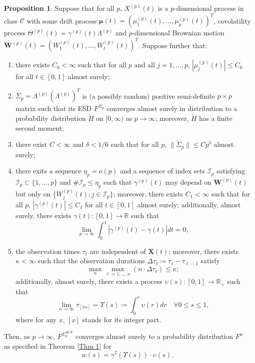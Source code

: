 \documentclass[a4paper,11pt]{book}
\theoremstyle{plain}
\theoremstyle{definition}
\newtheorem{prps}[thm]{Proposition}
\newcommand{\MR}{\mathbb{R}}
\begin{document}
    \begin{prps} \label{prps ups}
    	Suppose that for all $p$, $X^{(p)}(t)$ is a $p$-dimensional process in class $\mathcal{C}$ with some drift process $\boldsymbol{\mu}(t) = (\mu_1^{(p)}(t), \dots, \mu_p^{(p)}(t))^T$, covolatility process $\Theta^{(p)}(t) = \gamma^{(p)}(t) \Lambda^{(p)}$ and $p$-dimensional Brownian motion $\mathbf{W}^{(p)}(t) = (W_1^{(p)}(t), \dots, W_t^{(p)}(t) )^T$. Suppose further that:
    	\begin{enumerate}
    		\item there exists $C_0 < \infty$ such that for all $p$ and all $j = 1, \dots, p$, $|\mu_j^{(p)}(t)| \leq C_0$ for all $t \in [0, 1]$ almost surely;
    		\item $\breve{\Sigma}_p = \Lambda^{(p)} ( \Lambda^{(p)})^T $ is (a possibly random) positive semi-definite $p \times p$ matrix such that its ESD $F^{\breve{\Sigma}_p}$ converges almost surely in distribution to a probability distribution $\breve{H}$ on $[0,\infty)$ as $p \rightarrow \infty$; moreover, $\breve{H}$ has a finite second moment;
    		\item there exist $C < \infty$ and $\delta < 1/6$ such that for all $p$, $\|\breve{\Sigma}_p \| \leq Cp^\delta$ almost surely;
    		\item there exits a sequence $\eta_p = o(p)$ and a sequence of index sets $\mathcal{I}_p$ satisfying $\mathcal{I}_p \subset \{1, \dots, p\}$ and $\#\mathcal{I}_p \leq \eta_p$ such that $\gamma^{(p)}(t)$ may depend on $\mathbf{W}^{(p)}(t)$ but only on $\{W_j^{(p)}(t): j \in \mathcal{I}_p\}$; moreover, there exists $C_1 < \infty$ such that for all $p$, $|\gamma^{(p)}(t)| \leq C_1$ for all $t \in [0, 1]$ almost surely; additionally, almost surely, there exists $\gamma(t): [0, 1] \rightarrow \MR$ such that
    		\[ \lim_{p \rightarrow \infty} \int_{0}^{1} |\gamma^{(p)}(t) - \gamma(t) |dt = 0;  \]
    		\item the observation times $\tau_\ell$ are independent of $\mathbf{X}(t)$; moreover, there exists $\kappa < \infty$ such that the observation durations $\Delta \tau_\ell \coloneqq  \tau_\ell - \tau_{\ell-1}$ satisfy
    		\[ \max_{n} \max_{\ell = 1, \dots, n} (n \cdot \Delta \tau_\ell ) \leq \kappa; \]
    		additionally, almost surely, there exists a process $\upsilon(s) : [0, 1] \rightarrow \MR_+$ such that
    		\[ \lim_{n \rightarrow \infty} \tau_{[ns]} = \Upsilon(s) \coloneqq  \int_{0}^{s} \upsilon(r) dr \quad \forall 0 \leq s \leq 1, \]
    		where for any $x$, $[x]$ stands for its integer part.
     	\end{enumerate}
     	Then, as $p \rightarrow \infty$, $F^{\Sigma_p^{RCV}}$ converges almost surely to a probability distribution $F^w$ as specified in Theorem \ref{Thm 1} for
     	\[ w(s) = \gamma^2(\Upsilon(s)) \cdot \upsilon(s). \]
    \end{prps}
    
\end{document}
